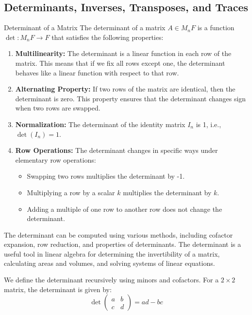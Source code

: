 \documentclass[openany]{book}
\begin{document}
\subsection{Determinants, Inverses, Transposes, and Traces}
\begin{mydefinition}{Determinant of a Matrix}
    The determinant of a matrix $A \in M_n{F}$ is a function $\det: M_n{F} \to F$ that satisfies the following properties:
    \begin{enumerate}
        \item \textbf{Multilinearity:} The determinant is a linear function in each row of the matrix. This means that if we fix all rows except one, the determinant behaves like a linear function with respect to that row.
        \item \textbf{Alternating Property:} If two rows of the matrix are identical, then the determinant is zero. This property ensures that the determinant changes sign when two rows are swapped.
        \item \textbf{Normalization:} The determinant of the identity matrix $I_n$ is 1, i.e., $\det(I_n) = 1$.
        \item \textbf{Row Operations:} The determinant changes in specific ways under elementary row operations:
            \begin{itemize}
                \item Swapping two rows multiplies the determinant by -1.
                \item Multiplying a row by a scalar $k$ multiplies the determinant by $k$.
                \item Adding a multiple of one row to another row does not change the determinant.
            \end{itemize}
    \end{enumerate}
\end{mydefinition}
\begin{mynote}
The determinant can be computed using various methods, including cofactor expansion, row reduction, and properties of determinants. The determinant is a useful tool in linear algebra for determining the invertibility of a matrix, calculating areas and volumes, and solving systems of linear equations.
\end{mynote}
We define the determinant recursively using minors and cofactors. For a $2 \times 2$ matrix, the determinant is given by:
\[\det\begin{pmatrix}a & b \\ c & d\end{pmatrix} = ad - bc\]
\end{document}
